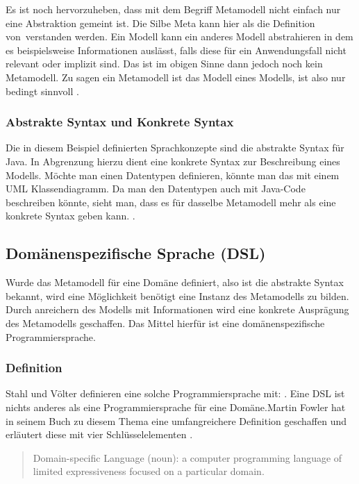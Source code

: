 \documentclass[12pt,oneside,a4paper,parskip]{scrbook}
\begin{document}
Es ist noch hervorzuheben, dass mit dem Begriff Metamodell nicht einfach nur eine Abstraktion gemeint ist. Die Silbe Meta kann hier als  \glqq die Definition von\grqq\ verstanden werden. Ein Modell kann ein anderes Modell abstrahieren in dem es beispielsweise Informationen auslässt, falls diese für ein Anwendungsfall nicht relevant oder implizit sind. Das ist im obigen Sinne dann jedoch noch kein Metamodell. Zu sagen ein Metamodell ist das Modell eines Modells, ist also nur bedingt sinnvoll \cite[S. 27]{voelter2013}.

\subsubsection{Abstrakte Syntax und Konkrete Syntax}

Die in diesem Beispiel definierten Sprachkonzepte sind die abstrakte Syntax für Java. In Abgrenzung hierzu dient eine konkrete Syntax zur Beschreibung eines Modells. Möchte man einen Datentypen definieren, könnte man das mit einem UML Klassendiagramm. Da man den Datentypen auch mit Java-Code beschreiben könnte, sieht man, dass es für dasselbe Metamodell mehr als eine konkrete Syntax geben kann. \cite[S. 59f.]{stahl2007}.

\subsection{Domänenspezifische Sprache (DSL)}

Wurde das Metamodell für eine Domäne definiert, also ist die abstrakte Syntax bekannt, wird eine Möglichkeit benötigt eine Instanz des Metamodells zu bilden. Durch anreichern des Modells mit Informationen wird eine konkrete Ausprägung des Metamodells geschaffen. Das Mittel hierfür ist eine domänenspezifische Programmiersprache.

\subsubsection{Definition}

Stahl und Völter definieren eine solche Programmiersprache mit: \cite[S. 30]{stahl2007}. \glqq Eine DSL ist nichts anderes als eine Programmiersprache für eine Domäne.\grqq Martin Fowler hat in seinem Buch zu diesem Thema eine umfangreichere Definition geschaffen und erläutert diese mit vier Schlüsselelementen \cite[S. 27f.]{fowler2010}.

\begin{quote}\glqq Domain-specific Language (noun): a computer programming language of limited expressiveness focused on a particular domain.\grqq \end{quote}
\end{document}

